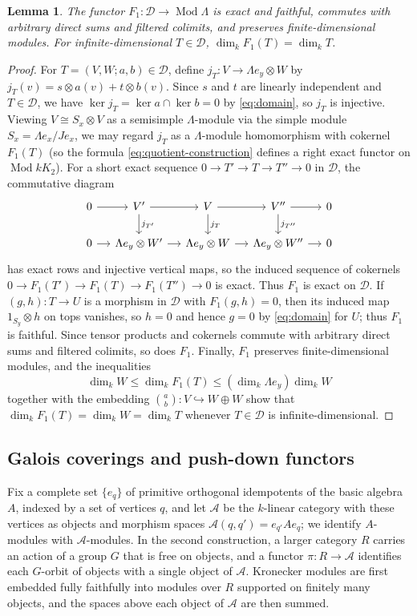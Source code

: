 \documentclass[a4paper,reqno,10pt]{amsart}
\newtheorem{lemma}[theorem]{Lemma}
\theoremstyle{definition}
\DeclareMathOperator{\Mod}{Mod}
\newcommand{\dm}{\dim_k}
\newcommand{\D}{\mathcal D}
\numberwithin{equation}{section}
\begin{document}
\begin{lemma}\label{lem:F1-properties}
The functor $F_1:\D\to\Mod\Lambda$ is exact and faithful, commutes
with arbitrary direct sums and filtered colimits, and preserves
finite-dimensional modules. For infinite-dimensional $T\in\D$,
$\dm F_1(T)=\dm T$.
\end{lemma}
\begin{proof}
For $T=(V,W;a,b)\in\D$, define $j_T:V\to\Lambda e_y\otimes W$ by
$j_T(v)=s\otimes a(v)+t\otimes b(v)$. Since $s$ and $t$ are linearly
independent and $T\in\D$, we have $\ker j_T=\ker a\cap\ker b=0$ by \eqref{eq:domain}, so $j_T$ is injective.
Viewing $V\cong S_x\otimes V$ as a semisimple $\Lambda$-module via the simple
module $S_x=\Lambda e_x/Je_x$, we may regard $j_T$ as a $\Lambda$-module homomorphism with cokernel $F_1(T)$ (so the formula \eqref{eq:quotient-construction} defines a right exact functor on $\Mod kK_2$).
For a short exact sequence
$0\to T'\to T\to T''\to0$ in $\D$, the commutative diagram
\[
\begin{tikzcd}[column sep=small]
0\arrow[r]&V'\arrow[r]\arrow[d,"j_{T'}"]&V\arrow[r]\arrow[d,"j_T"]&V''\arrow[r]\arrow[d,"j_{T''}"]&0\\
0\arrow[r]&\Lambda e_y\otimes W'\arrow[r]&\Lambda e_y\otimes W\arrow[r]&\Lambda e_y\otimes W''\arrow[r]&0
\end{tikzcd}
\]
has exact rows and injective vertical maps, so the induced sequence of cokernels
$0\to F_1(T')\to F_1(T)\to F_1(T'')\to0$ is exact.
Thus $F_1$ is exact on $\D$. If $(g,h):T\to U$ is a morphism in $\D$ with $F_1(g,h)=0$, then its induced map $1_{S_y}\otimes h$ on tops vanishes, so
$h=0$ and hence $g=0$ by \eqref{eq:domain} for $U$;
thus $F_1$ is faithful. Since tensor products and cokernels commute with
arbitrary direct sums and filtered colimits, so does $F_1$. Finally, $F_1$ preserves
finite-dimensional modules, and the inequalities
\[
 \dm W\le\dm F_1(T)\le(\dm\Lambda e_y)\dm W
\]
together with the embedding $\binom ab:V\hookrightarrow W\oplus W$ show that $\dm F_1(T)=\dm W=\dm T$ whenever $T\in\D$ is infinite-dimensional.
\end{proof}

\subsection{Galois coverings and push-down functors}
\label{sec:coverings}
Fix a complete set $\{e_q\}$ of primitive orthogonal idempotents of the basic
algebra $A$, indexed by a set of vertices $q$, and let $\mathcal A$ be the $k$-linear
category with these vertices as objects and morphism spaces
$\mathcal A(q,q')=e_{q'}Ae_q$; we identify $A$-modules with
$\mathcal A$-modules. In the second construction, a larger category $R$
carries an action of a group $G$ that is free on objects, and a functor
$\pi:R\to\mathcal A$ identifies each $G$-orbit of objects with a single object
of $\mathcal A$. Kronecker modules are first embedded fully
faithfully into modules over $R$ supported on finitely many objects, and the
spaces above each object of $\mathcal A$ are then summed.
\end{document}
